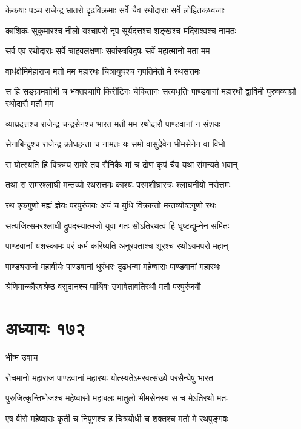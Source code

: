 \twolineshloka
{केकयाः पञ्च राजेन्द्र भ्रातरो दृढविक्रमाः}
{सर्वे चैव रथोदाराः सर्वे लोहितकध्वजाः}


\twolineshloka
{काशिकः सुकुमारश्च नीलो यश्चापरो नृप}
{सूर्यदत्तश्च शङ्खश्च मदिराश्वश्च नामतः}


\twolineshloka
{सर्व एव रथोदाराः सर्वे चाहवलक्षणाः}
{सर्वास्त्रविदुषः सर्वे महात्मानो मता मम}


\twolineshloka
{वार्धक्षेमिर्महाराज मतो मम महारथः}
{चित्रायुघश्च नृपतिर्मतो मे रथसत्तमः}


\threelineshloka
{स हि सङ्ग्रामशोभी च भक्तश्चापि किरीटिनः}
{चेकितानः सत्यधृतिः पाण्डवानां महारथौ}
{द्वाविमौ पुरुषव्याघ्रौ रथोदारौ मतौ मम}


\twolineshloka
{व्याघ्रदत्तश्च राजेन्द्र चन्द्रसेनश्च भारत}
{मतौ मम रथोदारौ पाण्डवानां न संशयः}


\twolineshloka
{सेनाबिन्दुश्च राजेन्द्र क्रोधहन्ता च नामतः}
{यः समो वासुदेवेन भीमसेनेन वा विभो}


\twolineshloka
{स योत्स्यति हि विक्रम्य समरे तव सैनिकैः}
{मां च द्रोणं कृपं चैव यथा संमन्यते भवान्}


\twolineshloka
{तथा स समरश्लाघी मन्तव्यो रथसत्तमः}
{काश्यः परमशीघ्रास्त्रः श्लाघनीयो नरोत्तमः}


\twolineshloka
{रथ एकगुणो मह्यं ज्ञेयः परपुरंजयः}
{अयं च युधि विक्रान्तो मन्तव्योष्टगुणो रथः}


\twolineshloka
{सत्यजित्समरश्लाघी द्रुपदस्यात्मजो युवा}
{गतः सोऽतिरथत्वं हि धृष्टद्युम्नेन संमितः}


\twolineshloka
{पाण्डवानां यशस्कामः परं कर्म करिष्यति}
{अनुरक्ताश्च शूरश्च रथोऽयमपरो महान्}


\twolineshloka
{पाण्ड्यराजो महावीर्यः पाण्डवानां धुरंधरः}
{दृढधन्वा महेष्वासः पाण्डवानां महारथः}


\twolineshloka
{श्रेणिमान्कौरवश्रेष्ठ वसुदानश्च पार्थिवः}
{उभावेतावतिरथौ मतौ परपुरंजयौ}


\chapter{अध्यायः १७२}
\twolineshloka
{भीष्म उवाच}
{}


\twolineshloka
{रोचमानो महाराज पाण्डवानां महारथः}
{योत्स्यतेऽमरवत्संख्ये परसैन्येषु भारत}


\twolineshloka
{पुरुजित्कृन्तिभोजश्च महेष्वासो महाबलः}
{मातुलो भीमसेनस्य स च मेऽतिरथो मतः}


\twolineshloka
{एष वीरो महेष्वासः कृती च निपुणश्च ह}
{चित्रयोधी च शक्तश्च मतो मे रथपुङ्गवः}


